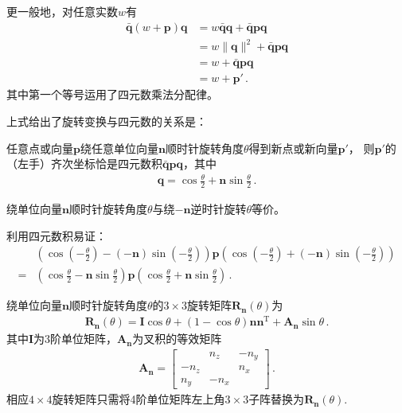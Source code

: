 更一般地，对任意实数$w$有
\begin{align}
    \bar{\bm q}(w+\bm p)\bm q & =w\bar{\bm q}\bm q+\bar{\bm q}\bm p\bm q\nonumber \\
                              & =w\|\bm q\|^2+\bar{\bm q}\bm p\bm q\nonumber      \\
                              & =w+\bar{\bm q}\bm p\bm q\nonumber                 \\
                              & =w+\bm p'\, .
\end{align}
其中第一个等号运用了四元数乘法分配律。

上式给出了旋转变换与四元数的关系是：
\begin{theorem}
    任意点或向量$\bm p$绕任意单位向量$\bm n$顺时针旋转角度$\theta$得到新点或新向量$\bm p'$，
    则$\bm p'$的（左手）齐次坐标恰是四元数积$\bar{\bm q}\bm p\bm q$，其中
    \begin{align}
        \bm q=\cos\frac{\theta}{2}+\bm n\sin\frac{\theta}{2}\, .
    \end{align}
\end{theorem}

\begin{corollary}
    绕单位向量$\bm n$顺时针旋转角度$\theta$与绕$-\bm n$逆时针旋转$\theta$等价。
\end{corollary}

\begin{prove}
    利用四元数积易证：
    \begin{align}
          & (\cos(-\frac{\theta}{2})-(-\bm n)\sin(-\frac{\theta}{2}))\bm p(\cos(-\frac{\theta}{2})+(-\bm n)\sin(-\frac{\theta}{2}))\nonumber \\
        = & (\cos\frac{\theta}{2}-\bm n\sin\frac{\theta}{2})\bm p(\cos\frac{\theta}{2}+\bm n\sin\frac{\theta}{2})\, .
    \end{align}
\end{prove}

\begin{theorem}
    绕单位向量$\bm n$顺时针旋转角度$\theta$的$3\times3$旋转矩阵$\bm R_{\bm n}(\theta)$为
    \begin{align}
        \bm R_{\bm n}(\theta)=\bm I\cos\theta+(1-\cos\theta)\bm n\bm n^\mathrm{T}+\bm A_{\bm n}\sin\theta\, .
    \end{align}
    其中$\bm I$为3阶单位矩阵，$\bm A_{\bm n}$为叉积的等效矩阵
    \begin{align}
        \bm A_{\bm n}=\left[
            \begin{array}{ccc}
                     & n_z  & -n_y \\
                -n_z &      & n_x  \\
                n_y  & -n_x &
            \end{array}
            \right]\, .
    \end{align}
    相应$4\times4$旋转矩阵只需将4阶单位矩阵左上角$3\times3$子阵替换为$\bm R_{\bm n}(\theta)$.
\end{theorem}

